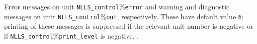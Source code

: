 \documentclass{spec}
\begin{document}
\hslgeneral


\hslio 
   Error messages on unit {\tt NLLS\_control$\%$error} and warning
   and diagnostic messages on unit {\tt NLLS\_control$\%$out},
   respectively. These have default value {\tt 6};
   printing of these messages is suppressed if the relevant unit number
   is negative or if {\tt NLLS\_control$\%$print\_level} is negative.
.

\hslmethod 
\label{method}


\hslexample

\end{document}
